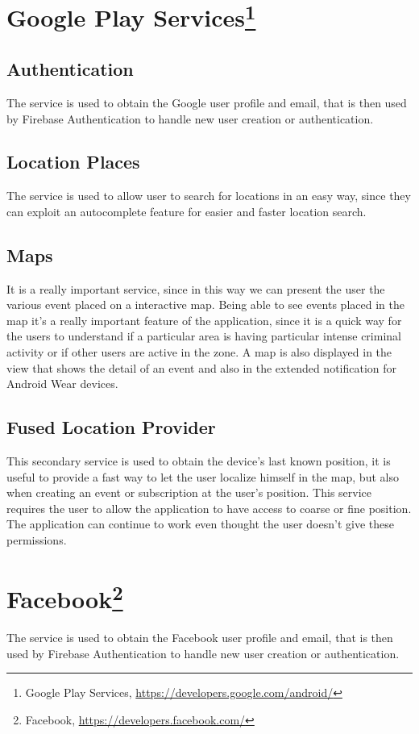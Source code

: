 \documentclass[a4paper]{scrreprt}
\begin{document}
\section[Google Play Services]{Google Play Services\footnote{Google Play Services, \url{https://developers.google.com/android/}}}
\subsection{Authentication}
The service is used to obtain the Google user profile and email, that is then used by Firebase Authentication to handle new user creation or authentication.

\subsection{Location Places}
The service is used to allow user to search for locations in an easy way, since they can exploit an autocomplete feature for easier and faster location search.

\subsection{Maps}
It is a really important service, since in this way we can present the user the various event placed on a interactive map. Being able to see events placed in the map it's a really important feature of the application, since it is a quick way for the users to understand if a particular area is having particular intense criminal activity or if other users are active in the zone. A map is also displayed in the view that shows the detail of an event and also in the extended notification for Android Wear devices.

\subsection{Fused Location Provider}
This secondary service is used to obtain the device's last known position, it is useful to provide a fast way to let the user localize himself in the map, but also when creating an event or subscription at the user's position. This service requires the user to allow the application to have access to coarse or fine position. The application can continue to work even thought the user doesn't give these permissions.

\section[Facebook]{Facebook\footnote{Facebook, \url{https://developers.facebook.com/}}}
The service is used to obtain the Facebook user profile and email, that is then used by Firebase Authentication to handle new user creation or authentication.
\end{document}
